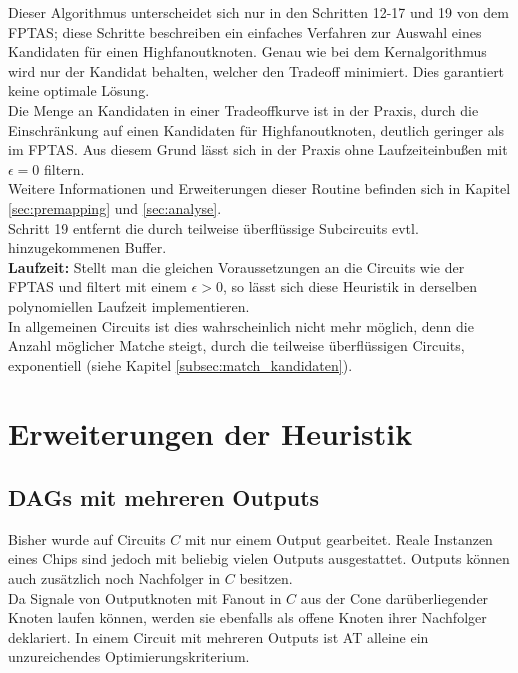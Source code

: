 \documentclass[11pt, a4paper, german]{article}
\begin{document}
Dieser Algorithmus unterscheidet sich nur in den Schritten 12-17 und 19 von dem FPTAS; diese Schritte beschreiben ein einfaches Verfahren zur Auswahl eines Kandidaten für einen Highfanoutknoten. Genau wie bei dem  Kernalgorithmus wird nur der Kandidat behalten, welcher den Tradeoff minimiert. Dies garantiert keine optimale Lösung. \\
Die Menge an Kandidaten in einer Tradeoffkurve ist in der Praxis, durch die Einschränkung auf einen Kandidaten für Highfanoutknoten, deutlich geringer als im FPTAS. Aus diesem Grund lässt sich in der Praxis ohne Laufzeiteinbußen mit $\epsilon = 0$ filtern.\\ 
Weitere Informationen und Erweiterungen dieser Routine befinden sich in Kapitel \ref{sec:premapping} und \ref{sec:analyse}. \\
Schritt 19 entfernt die durch teilweise überflüssige Subcircuits evtl. hinzugekommenen Buffer.\\

{\bf Laufzeit: } Stellt man die gleichen Voraussetzungen an die Circuits wie der FPTAS und filtert mit einem $\epsilon  > 0$, so lässt sich diese Heuristik in derselben polynomiellen Laufzeit implementieren.\\
In allgemeinen Circuits ist dies wahrscheinlich nicht mehr möglich, denn die Anzahl möglicher Matche steigt, durch die teilweise überflüssigen Circuits, exponentiell  (siehe Kapitel \ref{subsec:match_kandidaten}).


\section{Erweiterungen der Heuristik}
\label{sec:erw_der_heuristik}
\subsection{DAGs mit mehreren Outputs}
\label{sec:outputs}
Bisher wurde auf Circuits $C$ mit nur einem Output gearbeitet. Reale Instanzen eines Chips sind jedoch mit beliebig vielen Outputs ausgestattet. Outputs können auch zusätzlich noch Nachfolger in $C$ besitzen. \\

 Da Signale von Outputknoten mit Fanout in $C$ aus der Cone darüberliegender Knoten laufen können, werden sie ebenfalls als offene Knoten ihrer Nachfolger deklariert. In einem Circuit mit mehreren Outputs ist AT alleine ein unzureichendes Optimierungskriterium.
\end{document}
